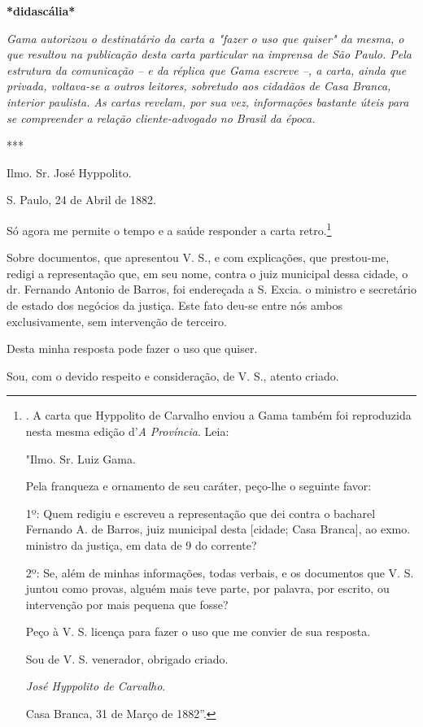 \textbf{*didascália*}

\emph{Gama autorizou o destinatário da carta a "fazer o uso que quiser"
da mesma, o que resultou na publicação desta carta particular na
imprensa de São Paulo. Pela estrutura da comunicação -- e da réplica que
Gama escreve --, a carta, ainda que privada, voltava-se a outros
leitores, sobretudo aos cidadãos de Casa Branca, interior paulista. As
cartas revelam, por sua vez, informações bastante úteis para se
compreender a relação cliente-advogado no Brasil da época.}

***

Ilmo. Sr. José Hyppolito.

S. Paulo, 24 de Abril de 1882.

Só agora me permite o tempo e a saúde responder a carta retro.\footnote{.
  A carta que Hyppolito de Carvalho enviou a Gama também foi reproduzida
  nesta mesma edição d'\emph{A} \emph{Província}. Leia:

  "Ilmo. Sr. Luiz Gama.

  Pela franqueza e ornamento de seu caráter, peço-lhe o seguinte favor:

  1º: Quem redigiu e escreveu a representação que dei contra o bacharel
  Fernando A. de Barros, juiz municipal desta {[}cidade; Casa Branca{]},
  ao exmo. ministro da justiça, em data de 9 do corrente?

  2º: Se, além de minhas informações, todas verbais, e os documentos que
  V. S. juntou como provas, alguém mais teve parte, por palavra, por
  escrito, ou intervenção por mais pequena que fosse?

  Peço à V. S. licença para fazer o uso que me convier de sua resposta.

  Sou de V. S. venerador, obrigado criado.

  \emph{José Hyppolito de Carvalho}.

  Casa Branca, 31 de Março de 1882''.}

Sobre documentos, que
apresentou V. S., e com explicações, que prestou-me, redigi a
representação que, em seu nome, contra o juiz municipal dessa cidade, o
dr. Fernando Antonio de Barros, foi endereçada a S. Excia. o ministro e
secretário de estado dos negócios da justiça. Este fato deu-se entre nós
ambos exclusivamente, sem intervenção de terceiro.

Desta minha resposta pode fazer o uso que quiser.

Sou, com o devido respeito e consideração, de V. S., atento criado.

